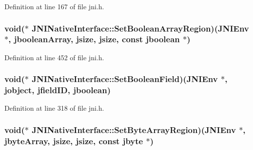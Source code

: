 Definition at line 167 of file jni.\-h.

\hypertarget{struct_j_n_i_native_interface_a6bdf0d27c43add38fe3af9bcdb3a4d4d}{
\subsubsection[{Set\-Boolean\-Array\-Region}]{\setlength{\rightskip}{0pt plus 5cm}void($\ast$ J\-N\-I\-Native\-Interface\-::\-Set\-Boolean\-Array\-Region)({\bf J\-N\-I\-Env} $\ast$, {\bf jboolean\-Array}, {\bf jsize}, {\bf jsize}, const {\bf jboolean} $\ast$)}}\label{struct_j_n_i_native_interface_a6bdf0d27c43add38fe3af9bcdb3a4d4d}


Definition at line 452 of file jni.\-h.

\hypertarget{struct_j_n_i_native_interface_adad7d66a2c6ef1a6fd945f6cac321c47}{
\subsubsection[{Set\-Boolean\-Field}]{\setlength{\rightskip}{0pt plus 5cm}void($\ast$ J\-N\-I\-Native\-Interface\-::\-Set\-Boolean\-Field)({\bf J\-N\-I\-Env} $\ast$, {\bf jobject}, {\bf jfield\-I\-D}, {\bf jboolean})}}\label{struct_j_n_i_native_interface_adad7d66a2c6ef1a6fd945f6cac321c47}


Definition at line 318 of file jni.\-h.

\hypertarget{struct_j_n_i_native_interface_a5e27402cc6f22e957aaab2dd938a3bd6}{
\subsubsection[{Set\-Byte\-Array\-Region}]{\setlength{\rightskip}{0pt plus 5cm}void($\ast$ J\-N\-I\-Native\-Interface\-::\-Set\-Byte\-Array\-Region)({\bf J\-N\-I\-Env} $\ast$, {\bf jbyte\-Array}, {\bf jsize}, {\bf jsize}, const {\bf jbyte} $\ast$)}}\label{struct_j_n_i_native_interface_a5e27402cc6f22e957aaab2dd938a3bd6}


